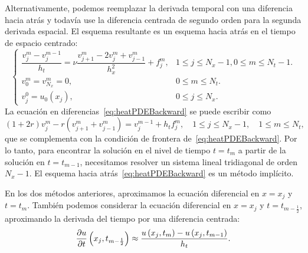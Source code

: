 \begin{frame}
	\frametitle{\insertsection}

	Alternativamente, podemos reemplazar la derivada temporal con una
	diferencia hacia atrás y todavía use la diferencia centrada de
	segundo orden para la segunda derivada espacial.
	El esquema resultante es un esquema hacia atrás en el
	tiempo de espacio centrado:
	\begin{equation}\label{eq:heatPDEBackward}
		\begin{cases}\displaystyle
			\dfrac{v^{m}_{j}-v^{m-1}_{j}}{h_{t}}=
			\nu
			\dfrac{v^{m}_{j+1}-2v^{m}_{j}+v^{m}_{j-1}}{h^{2}_{x}}+
			f^{m}_{j},                         &
			1\leq j\leq N_{x}-1, 0\leq m\leq N_{t}-1. \\
			v^{m}_{0}=v^{m}_{N_{x}}=0,         &
			0\leq m\leq N_{t}.                        \\
			v^{0}_{j}=u_{0}\left(x_{j}\right), &
			0\leq j\leq N_{x}.
		\end{cases}
	\end{equation}
	La ecuación en diferencias~\eqref{eq:heatPDEBackward} se puede
	escribir como
	\begin{equation*}
		\left(1+2r\right)v^{m}_{j}-
		r\left(v^{m}_{j+1}+v^{m}_{j-1}\right)=
		v^{m-1}_{j}+h_{t}f^{m}_{j},\quad
		1\leq j\leq N_{x}-1,\quad
		1\leq m\leq N_{t},
	\end{equation*}
	que se complementa con la condición de frontera
	de~\eqref{eq:heatPDEBackward}.
	Por lo tanto, para encontrar la solución en el nivel de tiempo
	$t=t_{m}$ a partir de la solución en $t=t_{m-1}$,
	necesitamos resolver un sistema lineal tridiagonal de orden
	$N_{x}-1$.
	El esquema hacia atrás~\eqref{eq:heatPDEBackward} es un método
	implícito.

	En los dos métodos anteriores, aproximamos la ecuación diferencial
	en $x=x_{j}$ y $t=t_{m}$.
	También podemos considerar la ecuación diferencial en $x=x_{j}$ y
	$t=t_{m-\frac{1}{2}}$, aproximando la derivada del tiempo por una
	diferencia centrada:
	\begin{equation*}
		\diffp{u}{t}
		\left(x_{j},t_{m-\frac{1}{2}}\right)\approx
		\frac{u\left(x_{j},t_{m}\right)-u\left(x_{j},t_{m-1}\right)}{h_{t}}.
	\end{equation*}
\end{frame}

